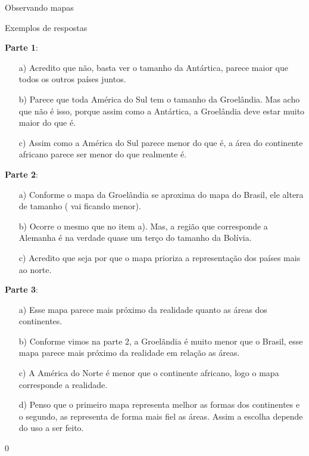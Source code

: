 \begin{answer}{Observando mapas}
{ Exemplos de respostas
  \vspace{.3em}

  \textbf{Parte 1}:
 
\begin{itemize}
\item[a)] Acredito que não, basta ver o tamanho da Antártica, parece maior que todos os outros países juntos. 
\item [b)] Parece que toda América do Sul tem o tamanho da Groelândia. Mas acho que não é isso, porque assim como a Antártica, a Groelândia deve estar muito maior do que é.
\item [c)] Assim como a América do Sul parece menor do que é, a área do continente africano parece ser menor do que realmente é.
\end{itemize} 
 
  \vspace{.3em}

  \textbf{Parte 2}:
  \begin{itemize}
\item[a)] Conforme o mapa da Groelândia se aproxima do mapa do Brasil, ele altera de tamanho ( vai ficando menor). 
\item [b)] Ocorre o mesmo que no item a). Mas, a região que corresponde a Alemanha é na verdade quase um terço do tamanho da Bolívia.  
\item [c)] Acredito que seja por que o mapa prioriza a representação dos países  mais ao norte.
  \end{itemize} 
  
  \vspace{.3em}
  \textbf{Parte 3}:
    \begin{itemize}
\item[a)]  Esse mapa parece mais próximo da realidade quanto as áreas dos continentes. 
\item [b)] Conforme vimos na parte 2, a Groelãndia é muito menor que o Brasil, esse mapa parece mais próximo da realidade em relação as áreas.   
\item [c)] A América do Norte é menor que o continente africano, logo o mapa corresponde a realidade.
\item [d)] Penso que o primeiro mapa representa melhor as formas dos continentes e o segundo, as representa de forma mais fiel as áreas. Assim a escolha depende do uso a ser feito.  

  \end{itemize} 
 
}{0}
\end{answer}



